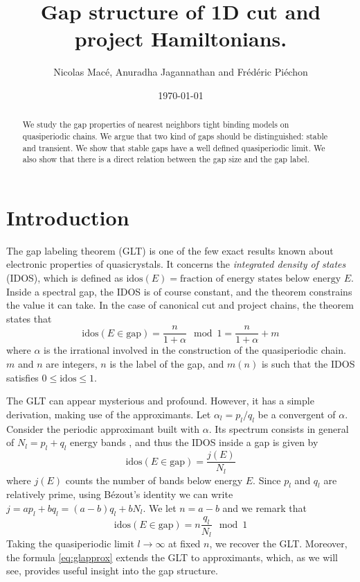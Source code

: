\documentclass[a4paper]{jpconf}
\newcommand{\id}{\ensuremath{\text{idos}}}
\begin{document}
\title{Gap structure of 1D cut and project Hamiltonians.}
\author{Nicolas Macé, Anuradha Jagannathan and Frédéric Piéchon}
\address{Laboratoire de Physique des Solides, Université Paris-Saclay, 91400 Orsay, France}


\date{\today}

\begin{abstract}
We study the gap properties of nearest neighbors tight binding models on quasiperiodic chains.
We argue that two kind of gaps should be distinguished: stable and transient.
We show that stable gaps have a well defined quasiperiodic limit. 
We also show that there is a direct relation between the gap size and the gap label.
\end{abstract}


\section*{Introduction}

The gap labeling theorem (GLT) \cite{bellissard} is one of the few exact results known about electronic properties of quasicrystals.
It concerns the \emph{integrated density of states} (IDOS), which is defined as $\id(E) = \text{fraction of energy states below energy~}E$.
Inside a spectral gap, the IDOS is of course constant, and the theorem constrains the value it can take.
In the case of canonical cut and project chains, the theorem states that
\begin{equation}
\label{eq:gl}
	\id(E \in \text{gap}) = \frac{n}{1+\alpha} \mod 1 = \frac{n}{1+\alpha} + m
\end{equation}
where $\alpha$ is the irrational involved in the construction of the quasiperiodic chain. 
$m$ and $n$ are integers, $n$ is the label of the gap, and $m(n)$ is such that the IDOS satisfies $0 \leq \id \leq  1$.

The GLT can appear mysterious and profound. However, it has a simple derivation, making use of the approximants.
Let $\alpha_l = p_l/q_l$ be a convergent of $\alpha$. 
Consider the periodic approximant built with $\alpha$.
Its spectrum consists in general of $N_l = p_l + q_l$ energy bands \cite{diffractionLuck, codimSire}, and thus the IDOS inside a gap is given by
\begin{equation}
	\id(E \in \text{gap}) = \frac{j(E)}{N_l}
\end{equation}
where $j(E)$ counts the number of bands below energy $E$.
Since $p_l$ and $q_l$ are relatively prime, using Bézout's identity we can write $j = a p_l + b q_l = (a-b) q_l + b N_l$.
We let $n = a-b$ and we remark that
\begin{equation}
\label{eq:glapprox}
	\id(E \in \text{gap}) = n \frac{q_l}{N_l} \mod 1
\end{equation}
Taking the quasiperiodic limit $l \to \infty$ at fixed $n$, we recover the GLT.
Moreover, the formula \eqref{eq:glapprox} extends the GLT to approximants, which, as we will see, provides useful insight into the gap structure.
\end{document}
